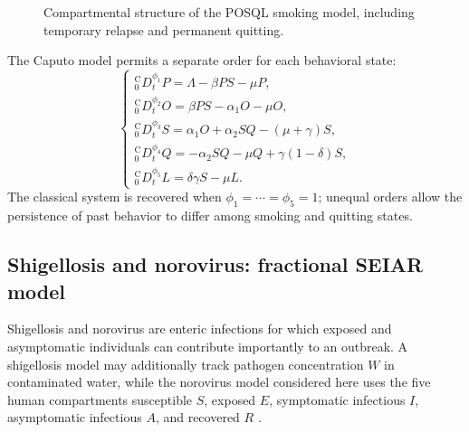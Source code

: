 \documentclass[00-main.tex]{subfiles}
\begin{document}
\begin{figure}[htbp]
\centering
{}
\caption{Compartmental structure of the POSQL smoking model, including temporary relapse and permanent quitting.}
\label{fig:smoking-posql}
\end{figure}

The Caputo model permits a separate order for each behavioral state:
\[
\begin{cases}
 {}_{0}^{\mathrm C}\!D_t^{\phi_1}P=\Lambda-\beta PS-\mu P,\\[3pt]
 {}_{0}^{\mathrm C}\!D_t^{\phi_2}O=\beta PS-\alpha_1O-\mu O,\\[3pt]
 {}_{0}^{\mathrm C}\!D_t^{\phi_3}S=\alpha_1O+\alpha_2SQ-(\mu+\gamma)S,\\[3pt]
 {}_{0}^{\mathrm C}\!D_t^{\phi_4}Q=-\alpha_2SQ-\mu Q+\gamma(1-\delta)S,\\[3pt]
 {}_{0}^{\mathrm C}\!D_t^{\phi_5}L=\delta\gamma S-\mu L.
\end{cases}
\]
The classical system is recovered when $\phi_1=\cdots=\phi_5=1$; unequal orders allow the persistence of past behavior to differ among smoking and quitting states.


\subsection{Shigellosis and norovirus: fractional SEIAR model}

Shigellosis and norovirus are enteric infections for which exposed and asymptomatic individuals can contribute importantly to an outbreak.
A shigellosis model may additionally track pathogen concentration $W$ in contaminated water, while the norovirus model considered here uses the five human compartments susceptible $S$, exposed $E$, symptomatic infectious $I$, asymptomatic infectious $A$, and recovered $R$ \cite{Ch21}.
\end{document}
